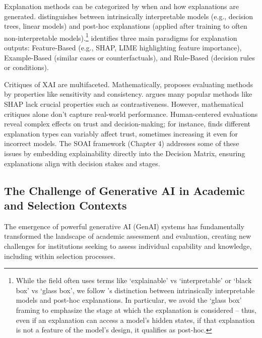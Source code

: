 Explanation methods can be categorized by when and how explanations are generated. \textcite{molnar_interpretable_2019} distinguishes between intrinsically interpretable models (e.g., decision trees, linear models) and post-hoc explanations (applied after training to often non-interpretable models).\footnote{While the field often uses terms like `explainable' vs `interpretable' or `black box' vs `glass box', we follow \textcite{molnar_interpretable_2019}'s distinction between intrinsically interpretable models and post-hoc explanations. In particular, we avoid the `glass box' framing to emphasize the stage at which the explanation is considered – thus, even if an explanation can access a model's hidden states, if that explanation is not a feature of the model's design, it qualifies as post-hoc.} \textcite{friedrich_taxonomy_2011} identifies three main paradigms for explanation outputs: Feature-Based (e.g., SHAP, LIME highlighting feature importance), Example-Based (similar cases or counterfactuals), and Rule-Based (decision rules or conditions).

Critiques of XAI are multifaceted. Mathematically, \textcite{doshi-velez_towards_2017} proposes evaluating methods by properties like sensitivity and consistency. \textcite{kumar_problems_2020} argues many popular methods like SHAP lack crucial properties such as contrastiveness. However, mathematical critiques alone don't capture real-world performance. Human-centered evaluations reveal complex effects on trust and decision-making; for instance, \textcite{lai_human_2019} finds different explanation types can variably affect trust, sometimes increasing it even for incorrect models. The SOAI framework (Chapter 4) addresses some of these issues by embedding explainability directly into the Decision Matrix, ensuring explanations align with decision stakes and stages.

\subsection{The Challenge of Generative AI in Academic and Selection Contexts}\label{ssec:context_genai}
The emergence of powerful generative AI (GenAI) systems has fundamentally transformed the landscape of academic assessment and evaluation, creating new challenges for institutions seeking to assess individual capability and knowledge, including within selection processes.

